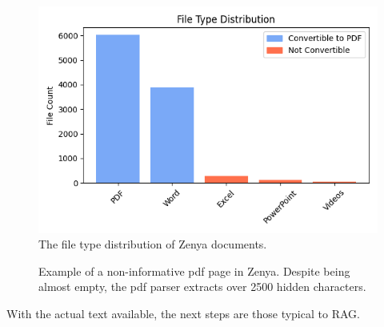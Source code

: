 \begin{figure}[H]
    \captionsetup{justification=centering}
    \centerline{\includegraphics[width=0.7\linewidth]{fig/file_type_distribution.png}}
    \caption{The file type distribution of Zenya documents.}
    \label{fig:file_type_distribution}
\end{figure}

\begin{figure}[H]
    \centerline{}
    \caption{Example of a non-informative pdf page in Zenya. Despite being almost empty, the pdf parser extracts over 2500 hidden characters.}
    \label{fig:pdf_clutter}
\end{figure}

With the actual text available, the next steps are those typical to RAG. 

